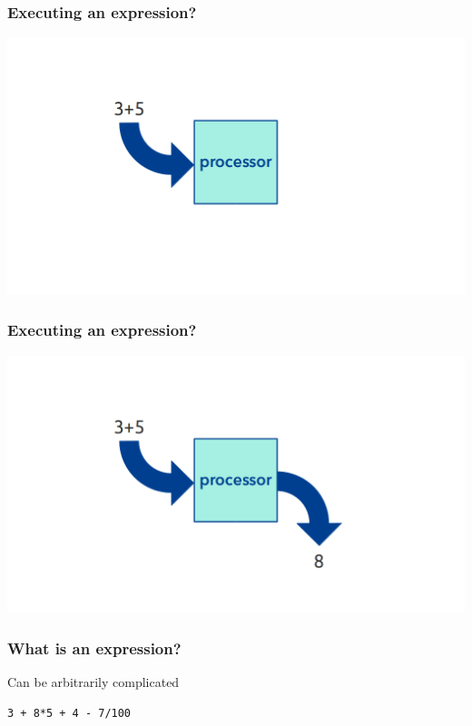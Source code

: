 \documentclass[11pt]{beamer}
\begin{document}
\begin{frame}
  \frametitle{Executing an expression?}
  \includegraphics[width=\textwidth]{./img/computer-expression-0.png}
\end{frame}

\begin{frame}
  \frametitle{Executing an expression?}
  \includegraphics[width=\textwidth]{./img/computer-expression-1.png}
\end{frame}

\begin{frame}
  \frametitle{What is an \textbf{expression}?}
  \Enlarge

  \begin{itemize}
  \myitem  Can be arbitrarily complicated
    \begin{itemize}
    \mysubitem  \texttt{3 + 8*5 + 4 - 7/100}
    \end{itemize}
  \end{itemize}
\end{frame}
\end{document}
